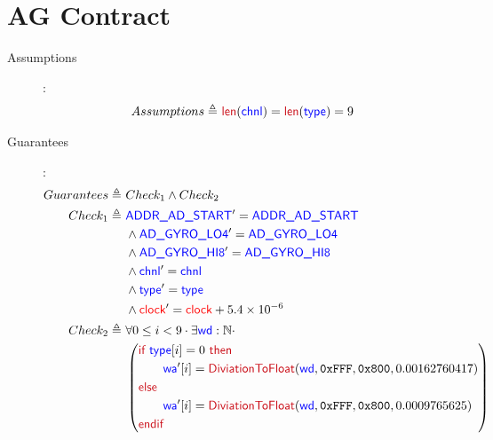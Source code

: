 \documentclass[fleqn,a4paper]{article}
\newcommand\Var[1]{\textcolor{blue}{\textsf{#1}}}
\newcommand\syntax[1]{\textcolor[RGB]{202,12,22}{\textsf{#1}}}
\newcommand\clock{\textcolor{red}{\textsf{clock}}}
\newcommand\definedby{\triangleq}
\begin{document}
\newpage

\section{AG Contract}

\begin{description}

\item[Assumptions]:
\begin{align*}
Assumptions \definedby \
& \syntax{len}(\Var{chnl}) = \syntax{len}(\Var{type}) = 9
\end{align*}

\item[Guarantees]:
\begin{align*}
Guarantees \definedby \
& Check_1 \wedge Check_2 \\
Check_1 \definedby \
& \Var{ADDR\_AD\_START}' = \Var{ADDR\_AD\_START} \\
& \wedge \Var{AD\_GYRO\_LO4}' = \Var{AD\_GYRO\_LO4} \\
& \wedge \Var{AD\_GYRO\_HI8}' = \Var{AD\_GYRO\_HI8} \\
& \wedge \Var{chnl}' = \Var{chnl} \\
& \wedge \Var{type}' = \Var{type} \\
& \wedge \clock' = \clock+5.4\times10^{-6} \\
Check_2 \definedby \
& \forall 0 \leq i < 9 \cdot \exists \Var{wd} : \mathbb{N} \cdot \\
& \left(
\begin{aligned}
& \syntax{if } \Var{type}[i] = 0 \syntax{ then} \\
& \qquad \Var{wa}'[i] = \syntax{DiviationToFloat}(\Var{wd},\texttt{0xFFF}, \texttt{0x800}, 0.00162760417) \\
& \syntax{else} \\
& \qquad \Var{wa}'[i] = \syntax{DiviationToFloat}(\Var{wd},\texttt{0xFFF}, \texttt{0x800}, 0.0009765625) \\
& \syntax{endif}
\end{aligned}
\right) \\
\end{align*}

\end{description}
\end{document}
